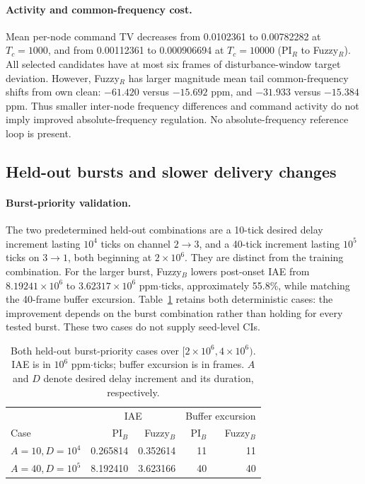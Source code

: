 \paragraph{Activity and common-frequency cost.}
Mean per-node command TV decreases from 0.0102361 to 0.00782282 at
$T_c=1000$, and from 0.00112361 to 0.000906694 at $T_c=10000$
(PI$_R$ to Fuzzy$_R$). All selected candidates have at most six frames
of disturbance-window target deviation. However, Fuzzy$_R$ has larger
magnitude mean tail common-frequency shifts from own clean:
$-61.420$ versus $-15.692$ ppm, and $-31.933$ versus $-15.384$ ppm.
Thus smaller inter-node frequency differences and command activity do not
imply improved absolute-frequency regulation. No absolute-frequency
reference loop is present.

\subsection{Held-out bursts and slower delivery changes}
\label{detail:subsec:eval_burst}

\paragraph{Burst-priority validation.}
The two predetermined held-out combinations are a 10-tick desired
delay increment lasting $10^4$ ticks on channel $2\to3$, and a
40-tick increment lasting $10^5$ ticks on $3\to1$, both beginning
at $2\times10^6$. They are distinct from the training combination.
For the larger burst, Fuzzy$_B$ lowers post-onset IAE from
$8.19241\times10^6$ to $3.62317\times10^6$ ppm$\cdot$ticks,
approximately 55.8\%, while matching the 40-frame buffer excursion.
Table~\ref{detail:tab:eval_heldout_bursts} retains both deterministic cases:
the improvement depends on the burst combination rather than holding
for every tested burst. These two cases do not supply seed-level CIs.

\begin{table}[t]
\caption{Both held-out burst-priority cases over
$[2\times10^6,4\times10^6)$. IAE is in $10^6$ ppm$\cdot$ticks;
buffer excursion is in frames. $A$ and $D$ denote desired delay
increment and its duration, respectively.}
\label{detail:tab:eval_heldout_bursts}
\centering
\begin{tabular}{@{}lrrrr@{}}\toprule
 & \multicolumn{2}{c}{IAE} & \multicolumn{2}{c}{Buffer excursion}\\
Case & PI$_B$ & Fuzzy$_B$ & PI$_B$ & Fuzzy$_B$\\\midrule
$A=10,D=10^4$ & 0.265814 & 0.352614 & 11 & 11\\
$A=40,D=10^5$ & 8.192410 & 3.623166 & 40 & 40\\\bottomrule
\end{tabular}
\end{table}

